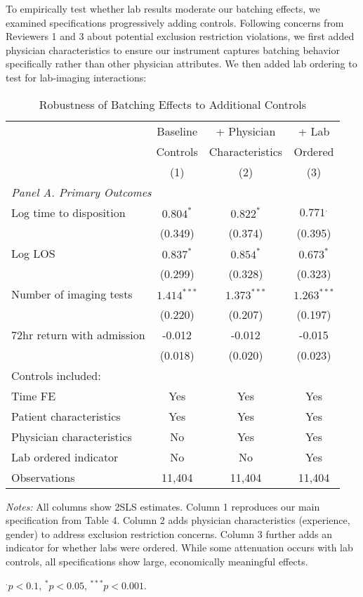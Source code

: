 \documentclass[11pt]{article}
\newcommand{\1}{\hbox{\rm 1\kern-.35em 1}}
\begin{document}
{{To empirically test whether lab results moderate our batching effects, we examined specifications progressively adding controls. Following concerns from Reviewers 1 and 3 about potential exclusion restriction violations, we first added physician characteristics to ensure our instrument captures batching behavior specifically rather than other physician attributes. We then added lab ordering to test for lab-imaging interactions:

\begin{table}[h]
\centering
\caption*{Robustness of Batching Effects to Additional Controls}
\begin{threeparttable}
\begin{tabular}{lccc}
\toprule
& Baseline & + Physician & + Lab \\
& Controls & Characteristics & Ordered \\
& (1) & (2) & (3) \\
\midrule
\multicolumn{4}{l}{\textit{Panel A. Primary Outcomes}} \\[0.5em]
Log time to disposition & $0.804^{*}$ & $0.822^{*}$ & $0.771^{.}$ \\
& (0.349) & (0.374) & (0.395) \\[0.5em]
Log LOS & $0.837^{*}$ & $0.854^{*}$ & $0.673^{*}$ \\
& (0.299) & (0.328) & (0.323) \\[0.5em]
Number of imaging tests & $1.414^{***}$ & $1.373^{***}$ & $1.263^{***}$ \\
& (0.220) & (0.207) & (0.197) \\[0.5em]
72hr return with admission & -0.012 & -0.012 & -0.015 \\
& (0.018) & (0.020) & (0.023) \\[0.5em]
\midrule
Controls included: \\
Time FE & Yes & Yes & Yes \\
Patient characteristics & Yes & Yes & Yes \\
Physician characteristics & No & Yes & Yes \\
Lab ordered indicator & No & No & Yes \\
\midrule
Observations & 11,404 & 11,404 & 11,404 \\
\bottomrule
\end{tabular}
\begin{tablenotes}
\footnotesize
\item \textit{Notes:} All columns show 2SLS estimates. Column 1 reproduces our main specification from Table 4. Column 2 adds physician characteristics (experience, gender) to address exclusion restriction concerns. Column 3 further adds an indicator for whether labs were ordered. While some attenuation occurs with lab controls, all specifications show large, economically meaningful effects.
\item $^{.} p < 0.1$, $^{*} p < 0.05$, $^{***} p < 0.001$.
\end{tablenotes}
\end{threeparttable}
\end{table}

}}
\end{document}
